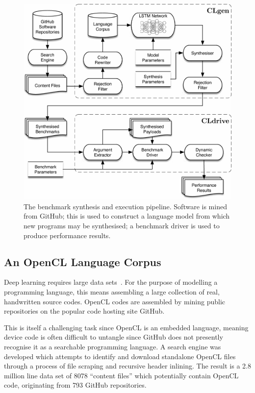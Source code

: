 \begin{figure}
	\centering%
	\includegraphics[width=\columnwidth]{img/clgen-pipeline}%
	\caption[Benchmark synthesis and execution pipeline]{%
    The benchmark synthesis and execution pipeline. Software is mined from GitHub; this is used to construct a language model from which new programs may be synthesised; a benchmark driver is used to produce performance results.%
  }%
	\label{fig:clgen-pipeline}
\end{figure}

\subsection{An OpenCL Language Corpus}
\label{subsec:opencl-lang-corpus}

Deep learning requires large data sets~\cite{LeCun2015}. For the purpose of modelling a programming language, this means assembling a large collection of real, handwritten source codes. OpenCL codes are assembled by mining public repositories on the popular code hosting site GitHub.

This is itself a challenging task since OpenCL is an embedded language, meaning device code is often difficult to untangle since GitHub does not presently recognise it as a searchable programming language. A search engine was developed which attempts to identify and download standalone OpenCL files through a process of file scraping and recursive header inlining. The result is a 2.8 million line data set of 8078 ``content files'' which potentially contain OpenCL code, originating from 793 GitHub repositories.


